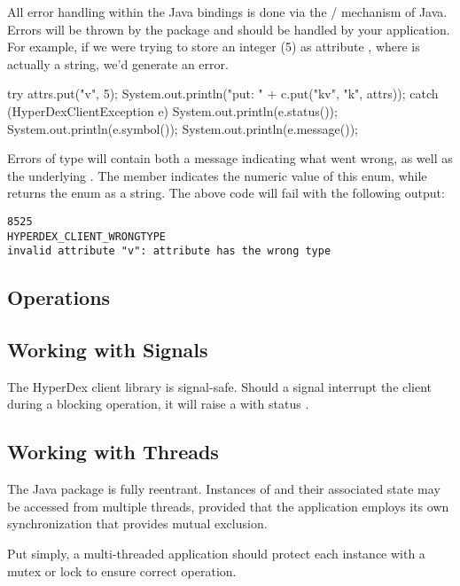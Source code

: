 All error handling within the Java bindings is done via the
/ mechanism of Java.  Errors will be thrown by the package
and should be handled by your application.  For example, if we were trying to
store an integer (5) as attribute , where  is actually a
string, we'd generate an error.

\begin{javacode}
try
{
    attrs.put("v", 5);
    System.out.println("put: " + c.put("kv", "k", attrs));
}
catch (HyperDexClientException e)
{
    System.out.println(e.status());
    System.out.println(e.symbol());
    System.out.println(e.message());
}
\end{javacode}

Errors of type  will contain both a message
indicating what went wrong, as well as the underlying .  The member  indicates the numeric
value of this enum, while  returns the enum as a string.  The above
code will fail with the following output:

\begin{verbatim}
8525
HYPERDEX_CLIENT_WRONGTYPE
invalid attribute "v": attribute has the wrong type
\end{verbatim}

\subsection{Operations}
\label{sec:api:java:ops}


\pagebreak

\subsection{Working with Signals}
\label{sec:api:java:signals}

The HyperDex client library is signal-safe.  Should a signal interrupt the
client during a blocking operation, it will raise a
 with status .

\subsection{Working with Threads}
\label{sec:api:Java:threads}

The Java package is fully reentrant.  Instances of
 and their associated state may be accessed from
multiple threads, provided that the application employs its own synchronization
that provides mutual exclusion.

Put simply, a multi-threaded application should protect each 
instance with a mutex or lock to ensure correct operation.
